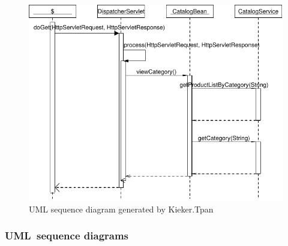 \begin{figure}\centering
\includegraphics[width=\columnwidth]{figures/20090710-163529-jpetstore-250Threads-400sDuration-200sRampup-sequenceDiagram-19503}%
\caption{UML sequence diagram generated by Kieker.Tpan}
\label{fig:vis:jpetSeqDiagr}
\end{figure}

\subsubsection{UML~sequence diagrams}


